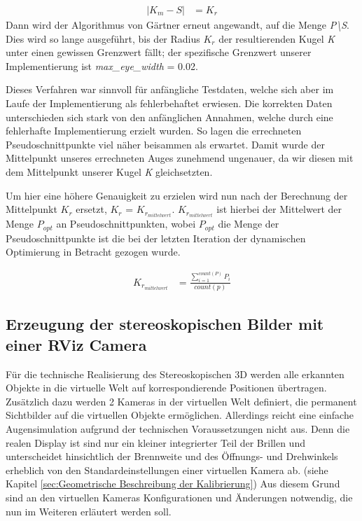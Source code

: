 \begin{align}
| K_m - S | &= K_r
\end{align} Dann wird der Algorithmus von Gärtner erneut angewandt, auf die Menge \emph{P\textbackslash S}. Dies wird so lange ausgeführt, bis
der Radius $K_r$ der resultierenden Kugel \emph{K} unter einen gewissen Grenzwert fällt; der spezifische Grenzwert unserer Implementierung ist \emph{max\_eye\_width} = 0.02.

Dieses Verfahren war sinnvoll für anfängliche Testdaten, welche sich aber im Laufe der Implementierung als fehlerbehaftet erwiesen. Die korrekten Daten unterschieden sich stark von den anfänglichen Annahmen, welche durch eine fehlerhafte Implementierung erzielt wurden. So lagen die errechneten Pseudoschnittpunkte viel näher beisammen als erwartet. Damit wurde der Mittelpunkt unseres errechneten Auges zunehmend ungenauer, da wir diesen mit dem Mittelpunkt
unserer Kugel \emph{K} gleichsetzten.

Um hier eine höhere Genauigkeit zu erzielen wird nun nach der Berechnung der Mittelpunkt $K_r$ ersetzt, $K_r$ = $K_{r_{mittelwert}}$. $K_{r_{mittelwert}}$ ist hierbei der Mittelwert der Menge $P_{opt}$ an Pseudoschnittpunkten, wobei $P_{opt}$ die Menge der Pseudoschnittpunkte ist die bei der letzten Iteration der dynamischen Optimierung in Betracht gezogen wurde.


\begin{align}
K_{r_{mittelwert}} &= \frac{\sum\limits_{i=1}^{count(P)} P_i}{count(p)} 
\end{align}

\subsection{Erzeugung der stereoskopischen Bilder mit einer RViz Camera}
Für die technische Realisierung des Stereoskopischen 3D werden alle erkannten Objekte in die virtuelle Welt auf korrespondierende Positionen übertragen. 
Zusätzlich dazu werden 2 Kameras in der virtuellen Welt definiert, die permanent Sichtbilder auf die virtuellen Objekte ermöglichen. Allerdings reicht eine einfache Augensimulation aufgrund der technischen Voraussetzungen nicht aus. 
Denn die realen Display ist sind nur ein kleiner integrierter Teil der Brillen und unterscheidet hinsichtlich der Brennweite und des Öffnungs- und Drehwinkels erheblich von den Standardeinstellungen einer virtuellen Kamera ab. (siehe Kapitel \ref{sec:Geometrische Beschreibung der Kalibrierung})
Aus diesem Grund sind an den virtuellen Kameras Konfigurationen und Änderungen notwendig, die nun im Weiteren erläutert werden soll. 


